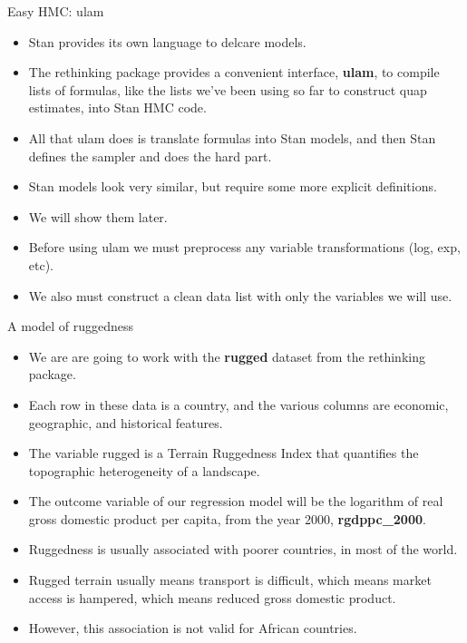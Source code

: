 \documentclass[handout]{beamer}
\begin{document}
\begin{frame}{Easy HMC: ulam}
\scriptsize{

\begin{itemize}
\item Stan provides its own language to delcare models.

\item  The rethinking package provides a convenient interface, \textbf{ulam}, to compile lists of formulas, like the lists we've been using so far to construct quap estimates, into Stan HMC
code.

\item All that ulam does is translate formulas into  Stan models, and then Stan defines
the sampler and does the hard part.

\item Stan models look very similar, but require some more explicit definitions.

\item We will show them later.

\item Before using ulam we must preprocess any variable transformations (log, exp, etc).

\item We also must construct a clean data list with only the variables we will use.



\end{itemize}




} 
\end{frame}


\begin{frame}{A model of ruggedness}
\scriptsize{

\begin{itemize}
\item We are are going to work with the \textbf{rugged} dataset from the rethinking package.
\item Each row in these data is a country, and the various columns are economic, geographic, and
historical features. 
\item The variable rugged is a Terrain Ruggedness Index that quantifies the topographic heterogeneity of a landscape. 

\item The outcome variable of our regression model will be the logarithm of real gross domestic product per capita, from the year 2000, \textbf{rgdppc\_2000}.

\item Ruggedness is usually associated with poorer countries, in most of the world.

\item Rugged terrain usually means transport is difficult, which means market access is hampered, which means reduced gross domestic product.

\item However, this association is not valid for African countries.


\end{itemize}




} 
\end{frame}
\end{document}
